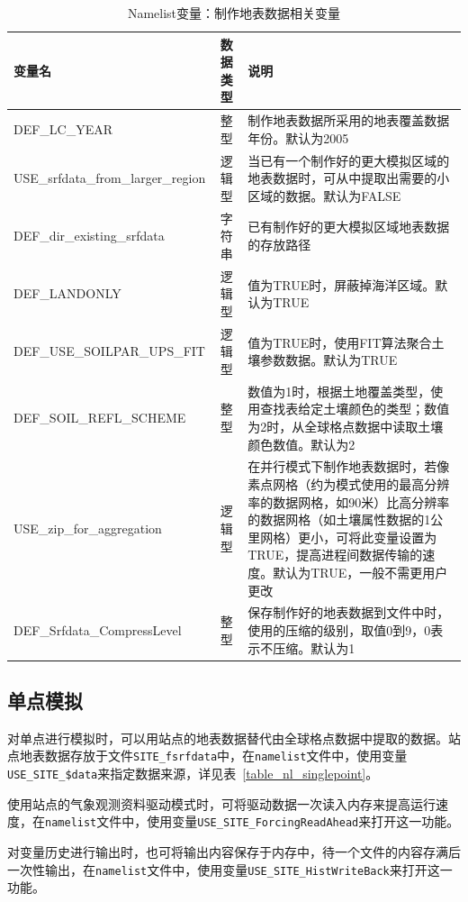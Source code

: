 \documentclass[a4paper,12pt,twoside]{article}
\begin{document}
\begin{table}[!htbp] \small
\caption{Namelist变量：制作地表数据相关变量} \label{table_nl_mksrfdata}
\centering \renewcommand{\arraystretch}{1.2}
\begin{tabular}{lcp{}}
\toprule
\textbf{变量名} & \textbf{数据类型} & \textbf{说明} \\\midrule
DEF\_LC\_YEAR & 整型 & 制作地表数据所采用的地表覆盖数据年份。默认为2005\\
USE\_srfdata\_from\_larger\_region & 逻辑型 & 当已有一个制作好的更大模拟区域的地表数据时，可从中提取出需要的小区域的数据。默认为FALSE \\
DEF\_dir\_existing\_srfdata & 字符串 & 已有制作好的更大模拟区域地表数据的存放路径 \\
DEF\_LANDONLY & 逻辑型 & 值为TRUE时，屏蔽掉海洋区域。默认为TRUE \\
DEF\_USE\_SOILPAR\_UPS\_FIT & 逻辑型 & 值为TRUE时，使用FIT算法聚合土壤参数数据。默认为TRUE \\
DEF\_SOIL\_REFL\_SCHEME & 整型 & 数值为1时，根据土地覆盖类型，使用查找表给定土壤颜色的类型；数值为2时，从全球格点数据中读取土壤颜色数值。默认为2\\ 
USE\_zip\_for\_aggregation & 逻辑型 & 在并行模式下制作地表数据时，若像素点网格（约为模式使用的最高分辨率的数据网格，如90米）比高分辨率的数据网格（如土壤属性数据的1公里网格）更小，可将此变量设置为TRUE，提高进程间数据传输的速度。默认为TRUE，一般不需更用户更改 \\
DEF\_Srfdata\_CompressLevel & 整型 & 保存制作好的地表数据到文件中时，使用的压缩的级别，取值0到9，0表示不压缩。默认为1\\
\bottomrule
\end{tabular} 
\end{table}



\subsection{单点模拟}

对单点进行模拟时，可以用站点的地表数据替代由全球格点数据中提取的数据。站点地表数据存放于文件\texttt{SITE\_fsrfdata}中，在\texttt{namelist}文件中，使用变量\texttt{USE\_SITE\_\allowbreak\$data}来指定数据来源，详见表~\ref{table_nl_singlepoint}。

使用站点的气象观测资料驱动模式时，可将驱动数据一次读入内存来提高运行速度，在\texttt{namelist}文件中，使用变量\texttt{USE\_SITE\_ForcingReadAhead}来打开这一功能。

对变量历史进行输出时，也可将输出内容保存于内存中，待一个文件的内容存满后一次性输出，在\texttt{namelist}文件中，使用变量\texttt{USE\_SITE\_HistWriteBack}来打开这一功能。
\end{document}
